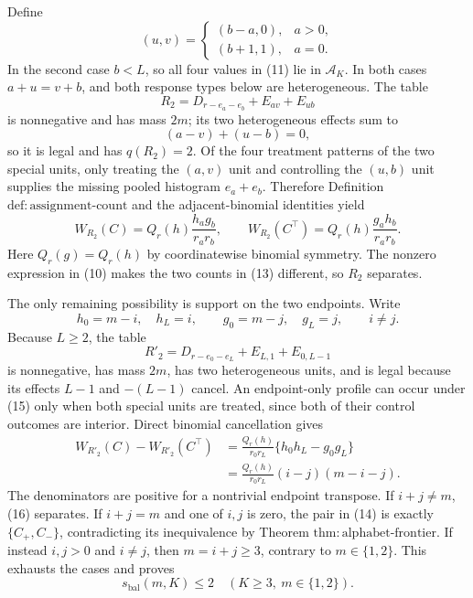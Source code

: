 Define
\[
(u,v)=
\begin{cases}
(b-a,0),&a>0,\\
(b+1,1),&a=0.
\end{cases} \tag{11}
\]
In the second case \(b<L\), so all four values in (11) lie in \(\mathcal A_K\). In both cases \(a+u=v+b\), and both response types below are heterogeneous. The table
\[
R_2=D_{r-e_a-e_b}+E_{av}+E_{ub} \tag{12}
\]
is nonnegative and has mass \(2m\); its two heterogeneous effects sum to
\[
(a-v)+(u-b)=0,
\]
so it is legal and has \(q(R_2)=2\). Of the four treatment patterns of the two special units, only treating the \((a,v)\) unit and controlling the \((u,b)\) unit supplies the missing pooled histogram \(e_a+e_b\). Therefore Definition \(\mathrm{def{:}assignment\text{-}count}\) and the adjacent-binomial identities yield
\[
W_{R_2}(C)=Q_r(h)\frac{h_ag_b}{r_ar_b},
\qquad
W_{R_2}(C^\top)=Q_r(h)\frac{g_ah_b}{r_ar_b}. \tag{13}
\]
Here \(Q_r(g)=Q_r(h)\) by coordinatewise binomial symmetry. The nonzero expression in (10) makes the two counts in (13) different, so \(R_2\) separates.

The only remaining possibility is support on the two endpoints. Write
\[
h_0=m-i,\quad h_L=i,\qquad
g_0=m-j,\quad g_L=j,\qquad i\neq j. \tag{14}
\]
Because \(L\geq2\), the table
\[
R'_2=D_{r-e_0-e_L}+E_{L,1}+E_{0,L-1} \tag{15}
\]
is nonnegative, has mass \(2m\), has two heterogeneous units, and is legal because its effects \(L-1\) and \(-(L-1)\) cancel. An endpoint-only profile can occur under (15) only when both special units are treated, since both of their control outcomes are interior. Direct binomial cancellation gives
\[
\begin{aligned}
W_{R'_2}(C)-W_{R'_2}(C^\top)
&=\frac{Q_r(h)}{r_0r_L}
\{h_0h_L-g_0g_L\}\\
&=\frac{Q_r(h)}{r_0r_L}(i-j)(m-i-j). \tag{16}
\end{aligned}
\]
The denominators are positive for a nontrivial endpoint transpose. If \(i+j\neq m\), (16) separates. If \(i+j=m\) and one of \(i,j\) is zero, the pair in (14) is exactly \(\{C_+,C_-\}\), contradicting its inequivalence by Theorem \(\mathrm{thm{:}alphabet\text{-}frontier}\). If instead \(i,j>0\) and \(i\neq j\), then \(m=i+j\geq3\), contrary to \(m\in\{1,2\}\). This exhausts the cases and proves
\[
s_{\mathrm{bal}}(m,K)\leq2
\quad(K\geq3,\ m\in\{1,2\}). \tag{17}
\]

